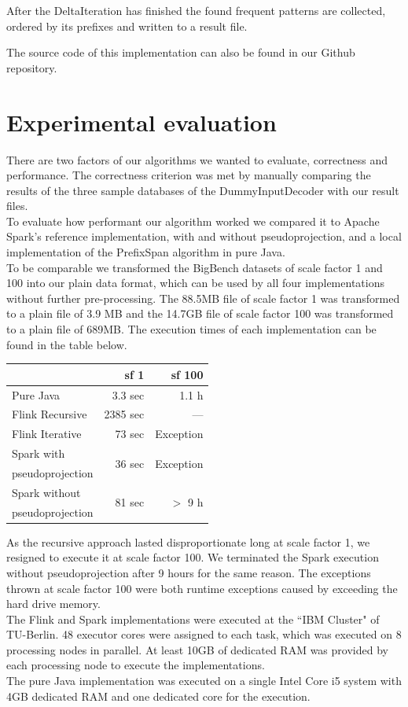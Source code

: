 \documentclass[a4paper,10pt,twocolumn]{article}
\begin{document}
After the DeltaIteration has finished the found frequent patterns are collected, ordered by its prefixes and written to a result file.

The source code of this implementation can also be found in our Github repository. \cite{GithubIterative}

\section{Experimental evaluation}
There are two factors of our algorithms we wanted to evaluate, correctness and performance. The correctness criterion was met by manually comparing the results of the three sample databases of the DummyInputDecoder with our result files.\\
To evaluate how performant our algorithm worked we compared it to Apache Spark's reference implementation,  with and without pseudoprojection, \cite{SparkPrefixSpan} and a local implementation of the PrefixSpan algorithm in pure Java. \cite{GithubPureJava}\\
To be comparable we transformed the BigBench datasets of scale factor 1 and 100 into our plain data format, which can be used by all four implementations without further pre-processing. The 88.5MB file of scale factor 1 was transformed to a plain file of 3.9 MB and the 14.7GB file of scale factor 100 was transformed to a plain file of 689MB. The execution times of each implementation can be found in the table below.

\begin{table}[h]
\centering
\begin{tabular}{l|r|r}
 & sf 1 & sf 100 \\\hline
Pure Java & 3.3 sec & 1.1 h \\\hline
Flink Recursive& 2385 sec & --- \\\hline
Flink Iterative& 73 sec & Exception\\\hline
Spark with & \multirow{2}{*}{36 sec} & \multirow{2}{*}{Exception} \\
pseudoprojection & & \\\hline
Spark without & \multirow{2}{*}{81 sec} & \multirow{2}{*}{$>$ 9 h} \\
pseudoprojection & & 
\end{tabular}
\end{table}

As the recursive approach lasted disproportionate long at scale factor 1, we resigned to execute it at scale factor 100. We terminated the Spark execution without pseudoprojection after 9 hours for the same reason. The exceptions thrown at scale factor 100 were both runtime exceptions caused by exceeding the hard drive memory.\\
The Flink and Spark implementations were executed at the ``IBM Cluster" of TU-Berlin. 48 executor cores were assigned to each task, which was executed on 8 processing nodes in parallel. At least 10GB of dedicated RAM was provided by each processing node to execute the implementations. \\
The pure Java implementation was executed on a single Intel Core i5 system with 4GB dedicated RAM and one dedicated core for the execution.
\end{document}
